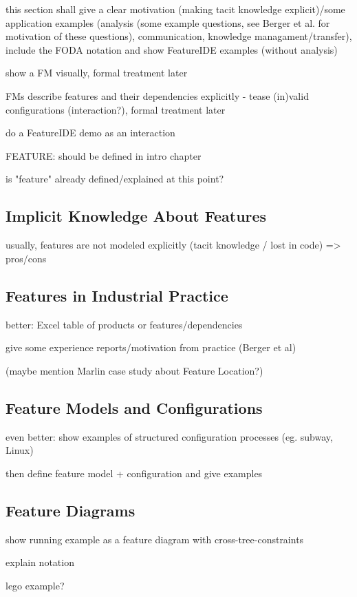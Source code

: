 this section shall give a clear motivation (making tacit knowledge explicit)/some application examples (analysis (some example questions, see Berger et al. for motivation of these questions), communication, knowledge managament/transfer), include the FODA notation and show FeatureIDE examples (without analysis)

show a FM visually, formal treatment later

FMs describe features and their dependencies explicitly - tease (in)valid configurations (interaction?), formal treatment later

do a FeatureIDE demo as an interaction





FEATURE: should be defined in intro chapter

is "feature" already defined/explained at this point?

\subsection{Implicit Knowledge About Features}

usually, features are not modeled explicitly (tacit knowledge / lost in code) => pros/cons

\subsection{Features in Industrial Practice}

better: Excel table of products or features/dependencies

give some experience reports/motivation from practice (Berger et al)

(maybe mention Marlin case study about Feature Location?)

\subsection{Feature Models and Configurations}

even better: show examples of structured configuration processes (eg. subway, Linux)

then define feature model + configuration and give examples

\subsection{Feature Diagrams}

show running example as a feature diagram with cross-tree-constraints

explain notation

lego example?

